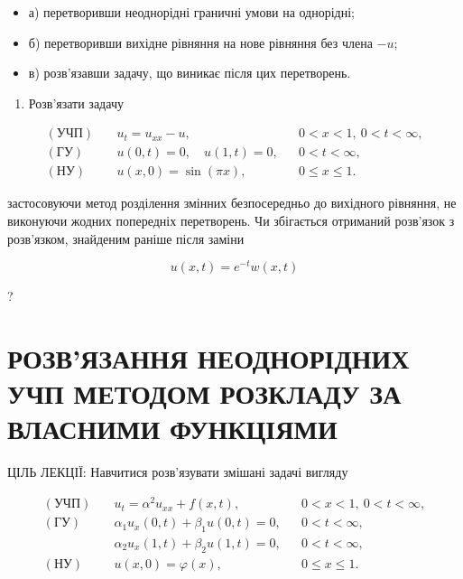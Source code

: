 \documentclass[
  ukrainian,
]{article}
\providecommand{\tightlist}{%
  \setlength{\itemsep}{0pt}\setlength{\parskip}{0pt}}
\begin{document}
\begin{itemize}
\tightlist
\item
  а) перетворивши неоднорідні граничні умови на однорідні;
\item
  б) перетворивши вихідне рівняння на нове рівняння без члена \(-u\);
\item
  в) розв'язавши задачу, що виникає після цих перетворень.
\end{itemize}

\begin{enumerate}
\def\labelenumi{\arabic{enumi}.}
\setcounter{enumi}{2}
\tightlist
\item
  Розв'язати задачу
\end{enumerate}

\[
\begin{aligned}
(\text{УЧП})\quad & u_t = u_{xx} - u, && 0 < x < 1,\ 0 < t < \infty, \\
(\text{ГУ})\quad & u(0,t) = 0,\quad u(1,t) = 0, && 0 < t < \infty, \\
(\text{НУ})\quad & u(x,0) = \sin(\pi x), && 0 \leqslant x \leqslant 1.
\end{aligned}
\]

застосовуючи метод розділення змінних безпосередньо до вихідного
рівняння, не виконуючи жодних попередніх перетворень. Чи збігається
отриманий розв'язок з розв'язком, знайденим раніше після заміни

\[
u(x,t) = e^{-t}w(x,t)
\]

?

\section{РОЗВ'ЯЗАННЯ НЕОДНОРІДНИХ УЧП МЕТОДОМ РОЗКЛАДУ ЗА ВЛАСНИМИ
ФУНКЦІЯМИ}\label{ux440ux43eux437ux432ux44fux437ux430ux43dux43dux44f-ux43dux435ux43eux434ux43dux43eux440ux456ux434ux43dux438ux445-ux443ux447ux43f-ux43cux435ux442ux43eux434ux43eux43c-ux440ux43eux437ux43aux43bux430ux434ux443-ux437ux430-ux432ux43bux430ux441ux43dux438ux43cux438-ux444ux443ux43dux43aux446ux456ux44fux43cux438}

ЦІЛЬ ЛЕКЦІЇ: Навчитися розв'язувати змішані задачі вигляду

\[
\begin{aligned}
(\text{УЧП})\quad & u_t = \alpha^2 u_{xx} + f(x,t), && 0 < x < 1,\ 0 < t < \infty, \\
(\text{ГУ})\quad & \alpha_1 u_x(0,t) + \beta_1 u(0,t) = 0, && 0 < t < \infty, \\
& \alpha_2 u_x(1,t) + \beta_2 u(1,t) = 0, && 0 < t < \infty, \\
(\text{НУ})\quad & u(x,0) = \varphi(x), && 0 \leqslant x \leqslant 1.
\end{aligned}
\]
\end{document}
